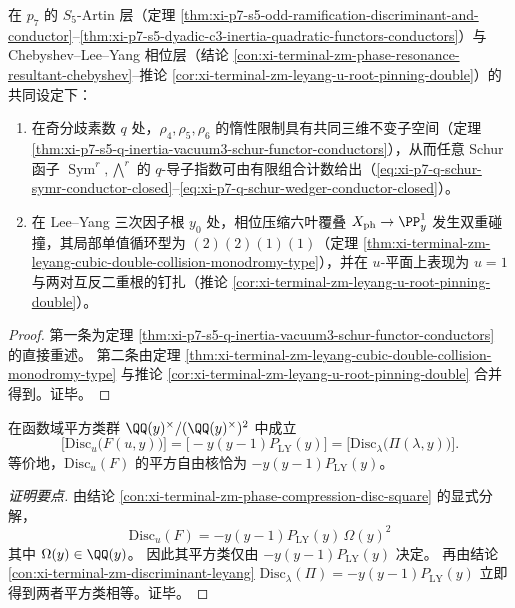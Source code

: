 \begin{theorem}[导子与单值群型给出的局部退化分层]\label{thm:xi-langlands-leyang-local-degeneration-stratification}
在 \(p_7\) 的 \(S_5\)-Artin 层（定理 \ref{thm:xi-p7-s5-odd-ramification-discriminant-and-conductor}--\ref{thm:xi-p7-s5-dyadic-c3-inertia-quadratic-functors-conductors}）与 Chebyshev--Lee--Yang 相位层（结论 \ref{con:xi-terminal-zm-phase-resonance-resultant-chebyshev}--推论 \ref{cor:xi-terminal-zm-leyang-u-root-pinning-double}）的共同设定下：
\begin{enumerate}
  \item 在奇分歧素数 \(q\) 处，\(\rho_4,\rho_5,\rho_6\) 的惰性限制具有共同三维不变子空间（定理 \ref{thm:xi-p7-s5-q-inertia-vacuum3-schur-functor-conductors}），从而任意 Schur 函子 \(\operatorname{Sym}^r,\bigwedge^r\) 的 \(q\)-导子指数可由有限组合计数给出（\eqref{eq:xi-p7-q-schur-symr-conductor-closed}--\eqref{eq:xi-p7-q-schur-wedger-conductor-closed}）。
  \item 在 Lee--Yang 三次因子根 \(y_0\) 处，相位压缩六叶覆叠 \(X_{\mathrm{ph}}\to\PP^1_y\) 发生双重碰撞，其局部单值循环型为 \((2)(2)(1)(1)\)（定理 \ref{thm:xi-terminal-zm-leyang-cubic-double-collision-monodromy-type}），并在 \(u\)-平面上表现为 \(u=1\) 与两对互反二重根的钉扎（推论 \ref{cor:xi-terminal-zm-leyang-u-root-pinning-double}）。
\end{enumerate}
\end{theorem}

\begin{proof}
第一条为定理 \ref{thm:xi-p7-s5-q-inertia-vacuum3-schur-functor-conductors} 的直接重述。
第二条由定理 \ref{thm:xi-terminal-zm-leyang-cubic-double-collision-monodromy-type} 与推论 \ref{cor:xi-terminal-zm-leyang-u-root-pinning-double} 合并得到。证毕。
\end{proof}

\begin{conclusion}\label{con:xi-terminal-zm-phase-compression-disc-squareclass-invariance}
在函数域平方类群 \(\QQ(y)^{\times}/(\QQ(y)^{\times})^{2}\) 中成立
\[
\bigl[\mathrm{Disc}_{u}\bigl(F(u,y)\bigr)\bigr]
=\bigl[-y(y-1)P_{\mathrm{LY}}(y)\bigr]
=\bigl[\mathrm{Disc}_{\lambda}\bigl(\Pi(\lambda,y)\bigr)\bigr].
\]
等价地，\(\mathrm{Disc}_{u}(F)\) 的平方自由核恰为 \(-y(y-1)P_{\mathrm{LY}}(y)\)。
\end{conclusion}
\begin{proof}[证明要点]
由结论 \ref{con:xi-terminal-zm-phase-compression-disc-square} 的显式分解，
\[
\mathrm{Disc}_{u}(F)
=-y(y-1)P_{\mathrm{LY}}(y)\,\Omega(y)^2
\]
其中 \(\Omega(y)\in\QQ(y)\)。
因此其平方类仅由 \(-y(y-1)P_{\mathrm{LY}}(y)\) 决定。
再由结论 \ref{con:xi-terminal-zm-discriminant-leyang}
\(
\mathrm{Disc}_{\lambda}(\Pi)=-y(y-1)P_{\mathrm{LY}}(y)
\)
立即得到两者平方类相等。证毕。
\end{proof}

